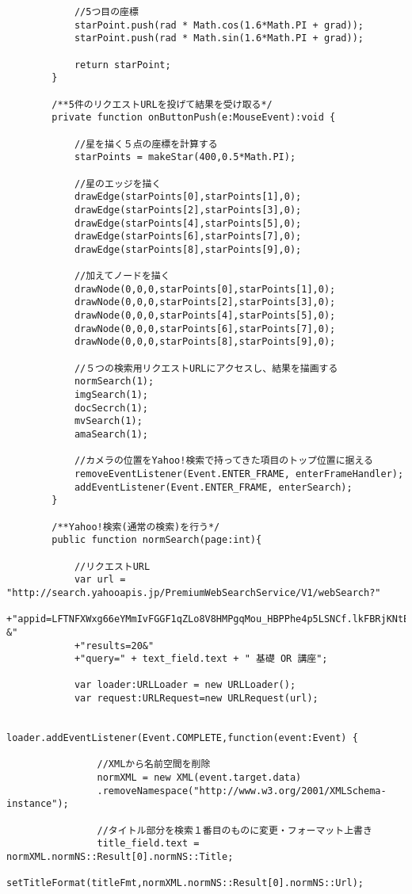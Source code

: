 {\begin{verbatim}
			//5つ目の座標
			starPoint.push(rad * Math.cos(1.6*Math.PI + grad));
			starPoint.push(rad * Math.sin(1.6*Math.PI + grad));
			
			return starPoint;
		}
		
		/**5件のリクエストURLを投げて結果を受け取る*/
		private function onButtonPush(e:MouseEvent):void {
			
			//星を描く５点の座標を計算する
			starPoints = makeStar(400,0.5*Math.PI);
			
			//星のエッジを描く
			drawEdge(starPoints[0],starPoints[1],0);
			drawEdge(starPoints[2],starPoints[3],0);
			drawEdge(starPoints[4],starPoints[5],0);
			drawEdge(starPoints[6],starPoints[7],0);
			drawEdge(starPoints[8],starPoints[9],0);
			
			//加えてノードを描く
			drawNode(0,0,0,starPoints[0],starPoints[1],0);
			drawNode(0,0,0,starPoints[2],starPoints[3],0);
			drawNode(0,0,0,starPoints[4],starPoints[5],0);
			drawNode(0,0,0,starPoints[6],starPoints[7],0);
			drawNode(0,0,0,starPoints[8],starPoints[9],0);
			
			//５つの検索用リクエストURLにアクセスし、結果を描画する
			normSearch(1);
			imgSearch(1);
			docSecrch(1);
			mvSearch(1);
			amaSearch(1);
			
			//カメラの位置をYahoo!検索で持ってきた項目のトップ位置に据える
			removeEventListener(Event.ENTER_FRAME, enterFrameHandler);
			addEventListener(Event.ENTER_FRAME, enterSearch);
		}
		
		/**Yahoo!検索(通常の検索)を行う*/
		public function normSearch(page:int){
			
			//リクエストURL
			var url = "http://search.yahooapis.jp/PremiumWebSearchService/V1/webSearch?"
			+"appid=LFTNFXWxg66eYMmIvFGGF1qZLo8V8HMPgqMou_HBPPhe4p5LSNCf.lkFBRjKNtE-&"
			+"results=20&"
			+"query=" + text_field.text + " 基礎 OR 講座";
			
			var loader:URLLoader = new URLLoader();
			var request:URLRequest=new URLRequest(url);

			loader.addEventListener(Event.COMPLETE,function(event:Event) {
									
				//XMLから名前空間を削除
				normXML = new XML(event.target.data)
				.removeNamespace("http://www.w3.org/2001/XMLSchema-instance");
				
				//タイトル部分を検索１番目のものに変更・フォーマット上書き
				title_field.text = normXML.normNS::Result[0].normNS::Title;
				setTitleFormat(titleFmt,normXML.normNS::Result[0].normNS::Url);
				

\end{verbatim}}

